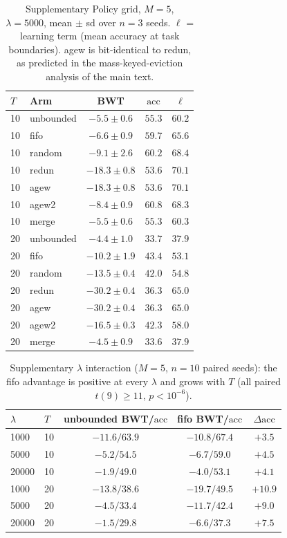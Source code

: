 \documentclass[11pt]{article}
\newcommand{\acc}{\mathrm{acc}}
\begin{document}
\begin{table}[htbp]
\centering\small
\caption{Supplementary Policy grid, $M{=}5$, $\lambda{=}5000$, mean $\pm$ sd over
$n{=}3$ seeds. $\ell$ = learning term (mean accuracy at task
boundaries). agew is bit-identical to redun, as predicted in the
mass-keyed-eviction analysis of the main text.}
\label{tab:supp-grid}
\begin{tabular}{llccc}
\toprule
$T$ & Arm & BWT & $\acc$ & $\ell$ \\
\midrule
10 & unbounded & $-5.5\pm0.6$   & $55.3$ & $60.2$ \\
10 & fifo      & $-6.6\pm0.9$   & $59.7$ & $65.6$ \\
10 & random    & $-9.1\pm2.6$   & $60.2$ & $68.4$ \\
10 & redun     & $-18.3\pm0.8$  & $53.6$ & $70.1$ \\
10 & agew      & $-18.3\pm0.8$  & $53.6$ & $70.1$ \\
10 & agew2     & $-8.4\pm0.9$   & $60.8$ & $68.3$ \\
10 & merge     & $-5.5\pm0.6$   & $55.3$ & $60.3$ \\
\midrule
20 & unbounded & $-4.4\pm1.0$   & $33.7$ & $37.9$ \\
20 & fifo      & $-10.2\pm1.9$  & $43.4$ & $53.1$ \\
20 & random    & $-13.5\pm0.4$  & $42.0$ & $54.8$ \\
20 & redun     & $-30.2\pm0.4$  & $36.3$ & $65.0$ \\
20 & agew      & $-30.2\pm0.4$  & $36.3$ & $65.0$ \\
20 & agew2     & $-16.5\pm0.3$  & $42.3$ & $58.0$ \\
20 & merge     & $-4.5\pm0.9$   & $33.6$ & $37.9$ \\
\bottomrule
\end{tabular}
\end{table}

\begin{table}[htbp]
\centering\small
\caption{Supplementary $\lambda$ interaction ($M{=}5$, $n{=}10$ paired seeds): the
fifo advantage is positive at every $\lambda$ and grows with $T$
(all paired $t(9)\geq 11$, $p<10^{-6}$).}
\label{tab:supp-lambda}
\begin{tabular}{llccc}
\toprule
$\lambda$ & $T$ & unbounded BWT/$\acc$ & fifo BWT/$\acc$ & $\Delta\acc$ \\
\midrule
1000  & 10 & $-11.6 / 63.9$ & $-10.8 / 67.4$ & $+3.5$ \\
5000  & 10 & $-5.2 / 54.5$  & $-6.7 / 59.0$  & $+4.5$ \\
20000 & 10 & $-1.9 / 49.0$  & $-4.0 / 53.1$  & $+4.1$ \\
1000  & 20 & $-13.8 / 38.6$ & $-19.7 / 49.5$ & $+10.9$ \\
5000  & 20 & $-4.5 / 33.4$  & $-11.7 / 42.4$ & $+9.0$ \\
20000 & 20 & $-1.5 / 29.8$  & $-6.6 / 37.3$  & $+7.5$ \\
\bottomrule
\end{tabular}
\end{table}
\end{document}
